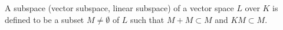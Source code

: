 A subspace (vector subspace, linear subspace) of a vector space $L$ over $K$ is defined to be a subset $M \neq \emptyset$ of $L$ such that $M + M \subset M$ and $K M \subset M$.
